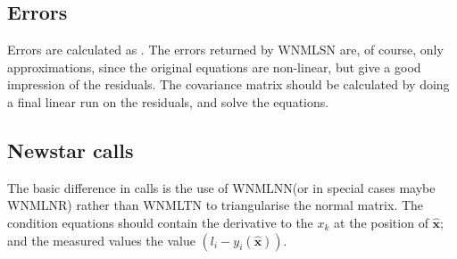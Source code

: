 \subsection{Errors}

Errors are calculated as . The errors
returned by WNMLSN are, of course, only approximations, since the original
equations are non-linear, but give a good impression of the residuals. The
covariance matrix should be calculated by doing a final linear run on the
residuals, and solve the equations.

\subsection{Newstar calls}

The basic difference in calls is the use of WNMLNN(or in special cases maybe
WNMLNR)  rather than WNMLTN to
triangularise the normal matrix. The
condition equations should contain the derivative to the $x_{k}$ at the
position of $\hat{\mathbf{x}}$; and the measured values the value
$\left(l_{i}-y_{i}(\hat{\mathbf{x}})\right)$.

